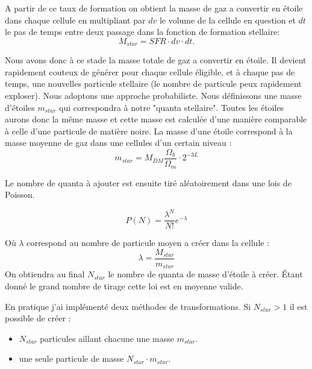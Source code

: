 A partir de ce taux de formation on obtient la masse de gaz a convertir en étoile dans chaque cellule en multipliant par $dv$ le volume de la cellule en question et $dt$ le pas de temps entre deux passage dans la fonction de formation stellaire:
\begin{equation}
	M_{star} = SFR \cdot dv \cdot dt .
\end{equation}

Nous avons donc à ce stade la masse totale de gaz a convertir en étoile.
Il devient rapidement couteux de générer pour chaque cellule éligible, et à chaque pas de temps, une nouvelles particule stellaire (le nombre de particule peux rapidement exploser).
Nous adoptons une approche probabiliste.
Nous définissons une masse d'étoiles $m_{star}$ qui correspondra à notre "quanta stellaire".
Toutes les étoiles aurons donc la même masse et cette masse est calculée d'une manière comparable à celle d'une particule de matière noire.
La masse d'une étoile correspond à la masse moyenne de gaz dans une cellules d'un certain niveau :
\begin{equation}
 m_{star} = M_{DM} \frac{\Omega_b}{\Omega_m}\cdot 2^{-3L}
\end{equation}

Le nombre de quanta à ajouter est ensuite tiré aléatoirement dans une lois de Poisson.

\begin{equation}
	P(N) = \frac{\lambda^N}{N!} e^{-\lambda}
\end{equation}

Où $\lambda$ correspond au nombre de particule moyen a créer dans la cellule :
\begin{equation}
\lambda = \frac{ M_{star}}{m_{star}}
\end{equation}
On obtiendra au final $N_{star}$ le nombre de quanta de masse d'étoile à créer.
Étant donné le grand nombre de tirage cette loi est en moyenne valide.

En pratique j'ai implémenté deux méthodes de transformations.
Si  $N_{star}>1$ il est possible de créer : 
\begin{itemize}
\item  $N_{star}$ particules aillant chacune une masse  $m_{star}$.
\item une seule particule de masse  $N_{star} \cdot m_{star}$.
\end{itemize}

